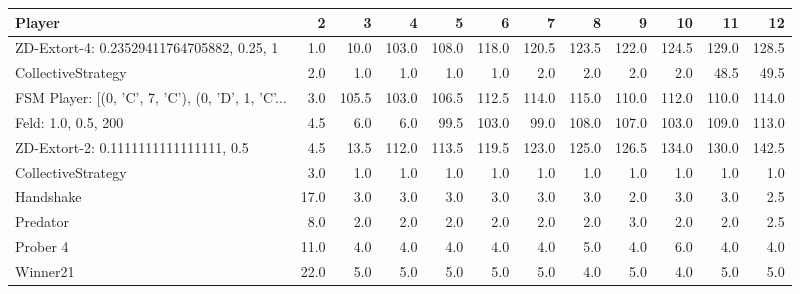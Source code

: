\begin{tabular}{lrrrrrrrrrrr}
\toprule
                                            Player &     2 &      3 &      4 &      5 &      6 &      7 &      8 &      9 &     10 &     11 &     12 \\
\midrule
         ZD-Extort-4: 0.23529411764705882, 0.25, 1 &   1.0 &   10.0 &  103.0 &  108.0 &  118.0 &  120.5 &  123.5 &  122.0 &  124.5 &  129.0 &  128.5 \\
                                CollectiveStrategy &   2.0 &    1.0 &    1.0 &    1.0 &    1.0 &    2.0 &    2.0 &    2.0 &    2.0 &   48.5 &   49.5 \\
 FSM Player: [(0, 'C', 7, 'C'), (0, 'D', 1, 'C'... &   3.0 &  105.5 &  103.0 &  106.5 &  112.5 &  114.0 &  115.0 &  110.0 &  112.0 &  110.0 &  114.0 \\
                               Feld: 1.0, 0.5, 200 &   4.5 &    6.0 &    6.0 &   99.5 &  103.0 &   99.0 &  108.0 &  107.0 &  103.0 &  109.0 &  113.0 \\
              ZD-Extort-2: 0.1111111111111111, 0.5 &   4.5 &   13.5 &  112.0 &  113.5 &  119.5 &  123.0 &  125.0 &  126.5 &  134.0 &  130.0 &  142.5 \\
                                CollectiveStrategy &   3.0 &    1.0 &    1.0 &    1.0 &    1.0 &    1.0 &    1.0 &    1.0 &    1.0 &    1.0 &    1.0 \\
                                         Handshake &  17.0 &    3.0 &    3.0 &    3.0 &    3.0 &    3.0 &    3.0 &    2.0 &    3.0 &    3.0 &    2.5 \\
                                          Predator &   8.0 &    2.0 &    2.0 &    2.0 &    2.0 &    2.0 &    2.0 &    3.0 &    2.0 &    2.0 &    2.5 \\
                                          Prober 4 &  11.0 &    4.0 &    4.0 &    4.0 &    4.0 &    4.0 &    5.0 &    4.0 &    6.0 &    4.0 &    4.0 \\
                                          Winner21 &  22.0 &    5.0 &    5.0 &    5.0 &    5.0 &    5.0 &    4.0 &    5.0 &    4.0 &    5.0 &    5.0 \\
\bottomrule
\end{tabular}
